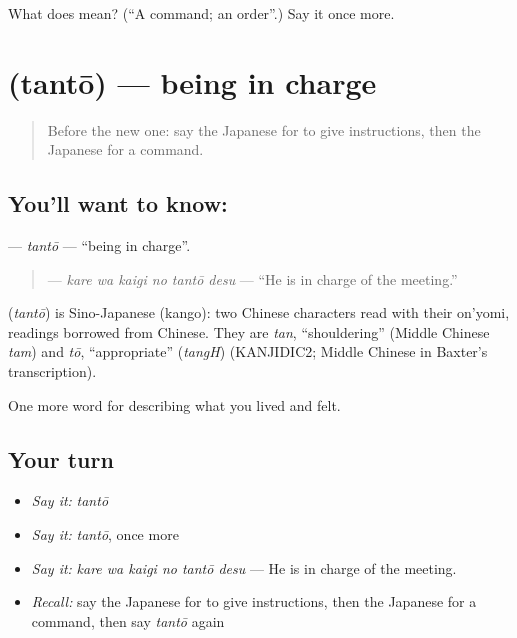 \begin{tcolorbox}[breakable,colback=teal!4,colframe=teal!35!black,title={Before you move on}]
What does  mean? (\textquotedblleft{}A command; an order\textquotedblright{}.) Say it once more.
\end{tcolorbox}
\section[\texorpdfstring{\ja{たんとう} (tantō)}{たんとう (tantō)}]{ (tantō) — being in charge}

\label{lesson:JA-C455-tantou}



\begin{quote}
Before the new one: say the Japanese for to give instructions, then the Japanese for a command.
\end{quote}

\subsection*{You'll want to know: }
\textbf{} — \emph{tantō} — \textquotedblleft{}being in charge\textquotedblright{}.

\begin{quote}
\textbf{  } — \emph{kare wa kaigi no tantō desu} — \textquotedblleft{}He is in charge of the meeting.\textquotedblright{}
\end{quote}

\begin{cousinweb}
\textbf{} (\emph{tantō}) is Sino-Japanese (kango): two Chinese characters read with their on'yomi, readings borrowed from Chinese. They are \emph{tan}, \textquotedblleft{}shouldering\textquotedblright{} (Middle Chinese \emph{tam}) and \emph{tō}, \textquotedblleft{}appropriate\textquotedblright{} (\emph{tangH}) (KANJIDIC2; Middle Chinese in Baxter's transcription).
\end{cousinweb}

\begin{grammarlens}[title={What you've built}]
One more word for describing what you lived and felt.
\end{grammarlens}

\subsection*{Your turn}
\begin{itemize}
\raggedright
  \item \emph{Say it:} \emph{tantō}
  \item \emph{Say it:} \emph{tantō}, once more
  \item \emph{Say it:} \emph{kare wa kaigi no tantō desu} — He is in charge of the meeting.
  \item \emph{Recall:} say the Japanese for to give instructions, then the Japanese for a command, then say \emph{tantō} again
\end{itemize}

